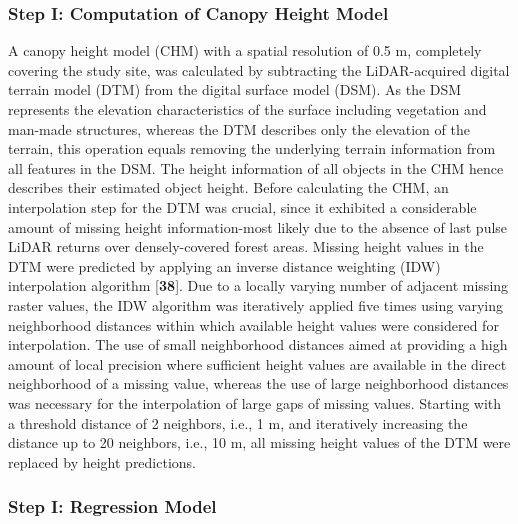 \subsubsection{Step I: Computation of Canopy Height Model}
\label{sec:step1}

A canopy height model (CHM) with a spatial resolution of 0.5 m, completely covering the study site, was calculated by subtracting the LiDAR-acquired digital terrain model (DTM) from the digital surface model (DSM). As the DSM represents the elevation characteristics of the surface including vegetation and man-made structures, whereas the DTM describes only the elevation of the terrain, this operation equals removing the underlying terrain information from all features in the DSM. The height information of all objects in the CHM hence describes their estimated object height. Before calculating the CHM, an interpolation step for the DTM was crucial, since it exhibited a considerable amount of missing height information-most likely due to the absence of last pulse LiDAR returns over densely-covered forest areas. Missing height values in the DTM were predicted by applying an inverse distance weighting (IDW) interpolation algorithm [\textbf{38}]. Due to a locally varying number of adjacent missing raster values, the IDW algorithm was iteratively applied five times using varying neighborhood distances within which available height values were considered for interpolation. The use of small neighborhood distances aimed at providing a high amount of local precision where sufficient height values are available in the direct neighborhood of a missing value, whereas the use of large neighborhood distances was necessary for the interpolation of large gaps of missing values. Starting with a threshold distance of 2 neighbors, i.e., 1 m, and iteratively increasing the distance up to 20 neighbors, i.e., 10 m, all missing height values of the DTM were replaced by height predictions.

\subsubsection{Step I: Regression Model}
\label{sec:step1regmod}

